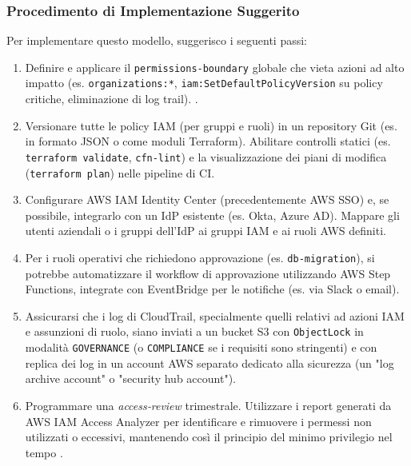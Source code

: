 \subsubsection{Procedimento di Implementazione Suggerito}
\label{subsubsec:procedura_iam}
Per implementare questo modello, suggerisco i seguenti passi:
\begin{enumerate}
  \item Definire e applicare il \texttt{permissions‑boundary} globale che vieta azioni ad alto impatto (es. \texttt{organizations:*}, \texttt{iam:SetDefaultPolicyVersion} su policy critiche, eliminazione di log trail). \cite{AWSPermBoundaries}.  
  \item Versionare tutte le policy IAM (per gruppi e ruoli) in un repository Git (es. in formato JSON o come moduli Terraform). Abilitare controlli statici (es. \texttt{terraform validate}, \texttt{cfn-lint}) e la visualizzazione dei piani di modifica (\texttt{terraform plan}) nelle pipeline di CI.  
  \item Configurare AWS IAM Identity Center (precedentemente AWS SSO) e, se possibile, integrarlo con un IdP esistente (es. Okta, Azure AD). Mappare gli utenti aziendali o i gruppi dell'IdP ai gruppi IAM e ai ruoli AWS definiti.  
  \item Per i ruoli operativi che richiedono approvazione (es. \texttt{db-migration}), si potrebbe automatizzare il workflow di approvazione utilizzando AWS Step Functions, integrate con EventBridge per le notifiche (es. via Slack o email).  
  \item Assicurarsi che i log di CloudTrail, specialmente quelli relativi ad azioni IAM e assunzioni di ruolo, siano inviati a un bucket S3 con \texttt{ObjectLock} in modalità \texttt{GOVERNANCE} (o \texttt{COMPLIANCE} se i requisiti sono stringenti) e con replica dei log in un account AWS separato dedicato alla sicurezza (un "log archive account" o "security hub account").  
  \item Programmare una \emph{access‑review} trimestrale. Utilizzare i report generati da AWS IAM Access Analyzer per identificare e rimuovere i permessi non utilizzati o eccessivi, mantenendo così il principio del minimo privilegio nel tempo \cite{DatadogLeastPrivilege}.  
\end{enumerate}

